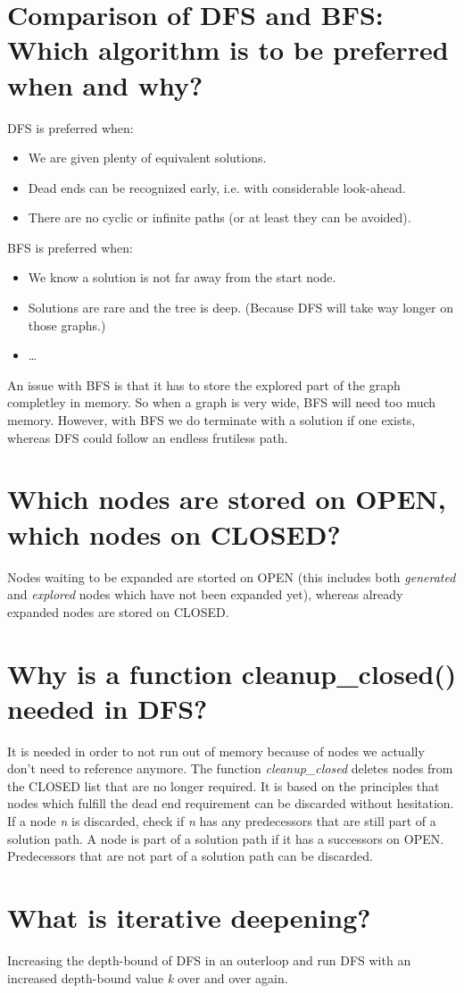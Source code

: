 \documentclass[12pt, a4paper]{article}
\begin{document}
\section{Comparison of DFS and BFS: Which algorithm is to be preferred when and why?}
DFS is preferred when:
\begin{itemize}
\item We are given plenty of equivalent solutions.
\item Dead ends can be recognized early, i.e. with considerable look-ahead.
\item There are no cyclic or infinite paths (or at least they can be avoided).
\end{itemize}
BFS is preferred when:
\begin{itemize}
\item We know a solution is not far away from the start node.
\item Solutions are rare and the tree is deep. (Because DFS will take way longer on those graphs.)
\item \ldots 
\end{itemize}
An issue with BFS is that it has to store the explored part of the graph completley in memory. So when a graph is very wide, BFS will need too much memory. However, with BFS we do terminate with a solution if one exists, whereas DFS could follow an endless frutiless path.

\section{Which nodes are stored on OPEN, which nodes on CLOSED?}
Nodes waiting to be expanded are storted on OPEN (this includes both \textit{generated} and \textit{explored} nodes which have not been expanded yet), whereas already expanded nodes are stored on CLOSED.

\section{Why is a function cleanup\_closed() needed in DFS?}
It is needed in order to not run out of memory because of nodes we actually don't need to reference anymore. The function \textit{cleanup\_closed} deletes nodes from the CLOSED list that are no longer required. It is based on the principles that nodes which fulfill the dead end requirement can be discarded without hesitation. If a node \textit{n} is discarded, check if  \textit{n} has any predecessors that are still part of a solution path. A node is part of a solution path if it has a successors on OPEN. Predecessors that are not part of a solution path can be discarded.

\section{What is iterative deepening?}
Increasing the depth-bound of DFS in an outerloop and run DFS with an increased depth-bound value \textit{k} over and over again.
\end{document}
